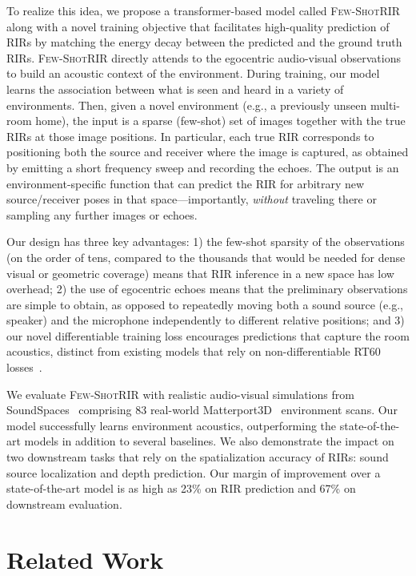 To realize this idea, we propose a transformer-based model called \textsc{Few-ShotRIR}  along with a novel training objective that facilitates high-quality prediction of RIRs by matching the energy decay between the predicted and the ground truth RIRs. \textsc{Few-ShotRIR}  directly attends to the egocentric audio-visual observations to build an acoustic context of the environment. During training, our model learns the association between what is seen and heard in a variety of environments.  Then, given a novel environment (e.g., a previously unseen multi-room home), the input is a sparse (few-shot) set of images together with the true RIRs at those image positions.  In particular, each true RIR corresponds to positioning both the source and receiver where the image is captured, as obtained by emitting a short frequency sweep and recording the echoes. The output is an environment-specific function that can predict the RIR for arbitrary new source/receiver poses in that space---importantly, \emph{without} traveling there or sampling any further images or echoes.    

Our design has three key advantages: 1) the few-shot sparsity of the observations (on the order of tens, compared to the thousands that would be needed for dense visual or geometric coverage) means that RIR inference in a new space has low overhead; 2) the use of egocentric echoes means that the preliminary observations are simple to obtain, as opposed to repeatedly moving both a sound source (e.g., speaker) and the microphone independently to different relative positions; and 3) our novel differentiable training loss  encourages predictions that capture the room acoustics, distinct from existing models that rely on non-differentiable RT60 losses~\cite{singh2021image2reverb, ratnarajah2022fast}.  

We evaluate \textsc{Few-ShotRIR}  with realistic audio-visual simulations from SoundSpaces~\citep{chen2020soundspaces} comprising 83 real-world Matterport3D~\citep{chang2017matterport3d} environment scans. Our model successfully learns environment acoustics, outperforming the state-of-the-art models in addition to several baselines. We also demonstrate the impact on two downstream tasks that rely on the spatialization accuracy of RIRs: sound source localization and depth prediction. Our margin of improvement over a state-of-the-art model is as high as 23\% on RIR prediction and  67\% on downstream evaluation.  

\section{Related Work}

